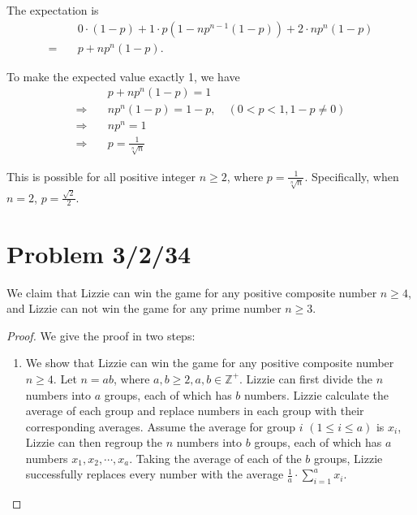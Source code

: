 \documentclass[11pt, oneside]{article}   	%
\begin{document}
 The expectation is
 \begin{align*}
& 0\cdot(1-p) +1\cdot p(1-n p^{n-1}(1-p)) +2\cdot n p^n (1-p)\\
= \quad & p + np^n (1-p).
 \end{align*}
 
 To make the expected value exactly 1, we have
 \begin{align*}
 &p + np^n (1-p)=1\\
 \Rightarrow \quad &np^n(1-p)=1-p, \quad (0<p<1, 1-p \ne 0)\\
 \Rightarrow \quad &np^n=1\\
 \Rightarrow \quad &p=\frac{1}{\sqrt[n]{n}}
 \end{align*}
 
 This is possible for all positive integer $n\ge 2$, where $p=\frac{1}{\sqrt[n]{n}}$. Specifically, when $n=2$, $p=\frac{\sqrt{2}}{2}$.
 
 
 
 \newpage
 \section{Problem 3/2/34}
 
We claim that Lizzie can win the game for any positive composite number $n\ge 4$, and Lizzie can not win the game for any prime number $n\ge 3$.
\begin{proof}
We give the proof in two steps:
\begin{enumerate}
\item We show that Lizzie can win the game for any positive composite number $n\ge 4$. Let $n=ab$, where $ a, b\ge 2, a, b\in \mathbb{Z^+}$. Lizzie can first divide the $n$ numbers into $a$ groups, each of which has $b$ numbers. Lizzie calculate the average of each group and replace numbers in each group with their corresponding averages. Assume the average for group $i$ $(1\le i \le a)$ is $x_i$, Lizzie can then regroup the $n$ numbers into $b$ groups, each of which has $a$ numbers $x_1, x_2,\cdots, x_a$. Taking the average of each of the $b$ groups, Lizzie successfully replaces every number with the average $\frac{1}{a}\cdot\sum^a_{i=1} x_i$.
\end{enumerate}






\end{proof}
\end{document}
